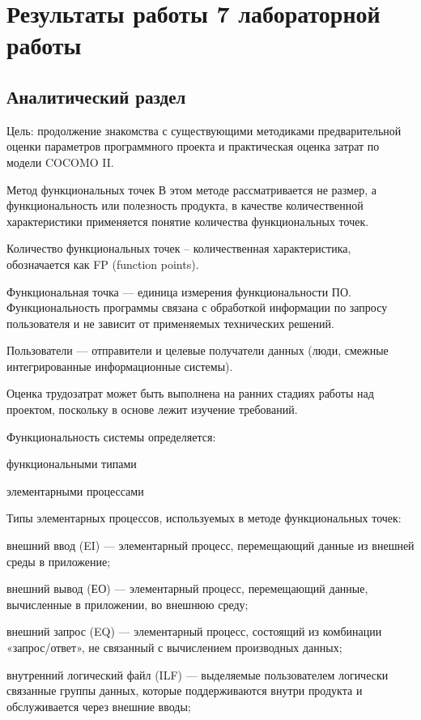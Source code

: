 \section{Результаты работы 7 лабораторной работы}

\subsection{Аналитический раздел}

Цель: продолжение знакомства с существующими методиками предварительной оценки параметров программного проекта и практическая оценка затрат по модели COCOMO II.

Метод функциональных точек
В этом методе рассматривается не размер, а функциональность или полезность продукта, в качестве количественной характеристики применяется понятие количества функциональных точек. 

Количество функциональных точек – количественная характеристика, обозначается как FP (function points).

Функциональная точка — единица измерения функциональности ПО. Функциональность программы связана с обработкой информации по запросу пользователя и не зависит от применяемых технических решений. 

Пользователи — отправители и целевые получатели данных (люди, смежные интегрированные информационные системы).

Оценка трудозатрат может быть выполнена на ранних стадиях работы над проектом, поскольку в основе лежит изучение требований.

Функциональность системы определяется:

функциональными типами

элементарными процессами

Типы элементарных процессов, используемых в методе функциональных точек:

внешний ввод (EI) — элементарный процесс, перемещающий данные из внешней среды в приложение;

внешний вывод (ЕО) — элементарный процесс, перемещающий данные, вычисленные в приложении, во внешнюю среду;

внешний запрос (EQ) — элементарный процесс, состоящий из комбинации «запрос/ответ», не связанный с вычислением производных данных;

внутренний логический файл (ILF) — выделяемые пользователем логически связанные группы данных, которые поддерживаются внутри продукта и обслуживается через внешние вводы;

